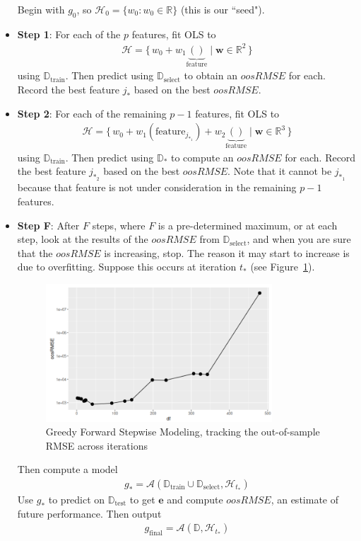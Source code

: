\documentclass[12pt, a4paper]{article}
\theoremstyle{definition}
\newcommand{\test}{\text{test}}
\newcommand{\train}{\text{train}}
\newcommand{\select}{\text{select}}
\newcommand{\Dtest}{\mathbb{D}_{\test}}
\newcommand{\Dtrain}{\mathbb{D}_{\train}}
\newcommand{\Dselect}{\mathbb{D}_{\select}}
\begin{document}
\begin{itemize}
		Begin with $g_0$, so $\mathcal{H}_0=\{w_0:w_0\in \mathbb{R}\}$ (this is our ``seed").
		\item \textbf{Step 1}: For each of the $p$ features, fit OLS to
		\begin{align*}
			\mathcal{H} = \{\,
			w_0+w_1\underbrace{()}_{\text{feature}}\mid \bm{w}\in\mathbb{R}^2
			\,\}
		\end{align*}
		using $\Dtrain$. Then predict using $\Dselect$ to obtain an $oosRMSE$ for each.
		Record the best feature $j_*$ based on the best $oosRMSE$.
		\item \textbf{Step 2}: For each of the remaining $p-1$ features, fit OLS to
		\begin{align*}
			\mathcal{H} = \{\,
			w_0 + w_1(\text{feature}_{j_{*_1}}) + w_2\underbrace{()}_{\text{feature}} \mid
			\bm{w}\in\mathbb{R}^3
			\,\}
		\end{align*}
		using $\Dtrain$. Then predict using $\mathbb{D}_*$ to compute an $oosRMSE$ for
		each. Record the best feature $j_{*_2}$ based on the best $oosRMSE$.
		Note that it cannot be $j_{*_1}$ because that feature is not under consideration
		in the remaining $p-1$ features.
		\item \textbf{Step F}: After $F$ steps, where $F$ is a pre-determined maximum, or
		at each step, look at the results of the $oosRMSE$ from $\Dselect$, and when you
		are sure that the $oosRMSE$ is increasing, stop. The reason it may start to
		increase is due to overfitting. Suppose this occurs at iteration $t_*$
		(see Figure~\ref{fig:greedy-stepwise-oosRMSE}).
		\begin{figure}
			\centering
			\includegraphics[width=0.8\textwidth]{greedy-forward-stepwise-oosRMSE-by-iteration}
			\caption{Greedy Forward Stepwise Modeling, tracking the out-of-sample RMSE
			across iterations}
			\label{fig:greedy-stepwise-oosRMSE}
		\end{figure}
		Then compute a model
		\begin{align*}
			g_* = \mathcal{A}(\Dtrain \cup \Dselect, \mathcal{H}_{t_*})
		\end{align*}
		Use $g_*$ to predict on $\Dtest$ to get $\bm{e}$ and compute $oosRMSE$, an
		estimate of future performance. Then output
		\begin{align*}
			g_{\text{final}} = \mathcal{A}(\mathbb{D}, \mathcal{H}_{t_*})
		\end{align*}
	\end{itemize}
\end{document}
